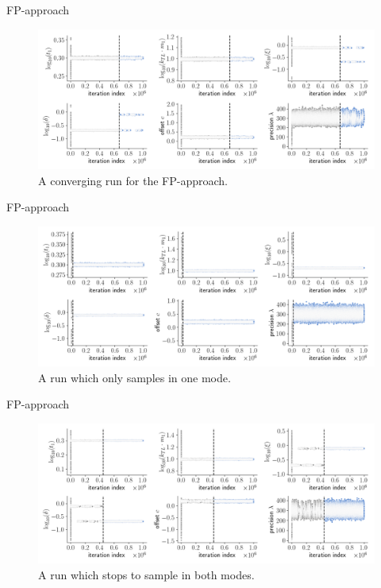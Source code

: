 \documentclass{beamer}
\begin{document}
	\begin{frame}{FP-approach}
		\begin{figure}
			\includegraphics[width=1\columnwidth]
			{plots/mRNA_FP/parameters_mRNA_FP_2.png}
			\caption{A converging run for the FP-approach.}
		\end{figure}
	\end{frame}
	
	\begin{frame}{FP-approach}
		\begin{figure}
			\includegraphics[width=1\columnwidth]
			{plots/mRNA_FP/parameters_mRNA_FP_7.png}
			\caption{A run which only samples in one mode.}
		\end{figure}
	\end{frame}
	
	\begin{frame}{FP-approach}
		\begin{figure}
			\includegraphics[width=1\columnwidth]
			{plots/mRNA_FP/parameter/parameters_mRNA_FP_28.png}
			\caption{A run which stops to sample in both modes.}
		\end{figure}
	\end{frame}
	
\end{document}
